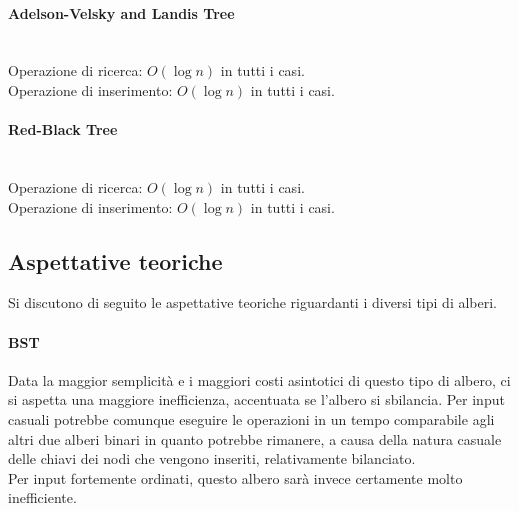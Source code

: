 \documentclass{article}
\begin{document}
	\paragraph{Adelson-Velsky and Landis Tree}\mbox{}\\
	Operazione di ricerca: $O\left(\log{n}\right)$ in tutti i casi.\\
	Operazione di inserimento: $O\left(\log{n}\right)$ in tutti i casi. \\
	
	\paragraph{Red-Black Tree}\mbox{}\\
	Operazione di ricerca: $O\left(\log{n}\right)$ in tutti i casi.\\
	Operazione di inserimento: $O\left(\log{n}\right)$ in tutti i casi. \\
	
	\newpage
	\subsection{Aspettative teoriche}
	Si discutono di seguito le aspettative teoriche riguardanti i diversi tipi di alberi.
	
	\paragraph{BST}
	Data la maggior semplicità e i maggiori costi asintotici di questo tipo di albero, ci si aspetta una maggiore inefficienza, accentuata se l'albero si sbilancia. Per input casuali potrebbe comunque eseguire le operazioni in un tempo comparabile agli altri due alberi binari in quanto potrebbe rimanere, a causa della natura casuale delle chiavi dei nodi che vengono inseriti, relativamente bilanciato.\\
	Per input fortemente ordinati, questo albero sarà invece certamente molto inefficiente.
	
\end{document}
